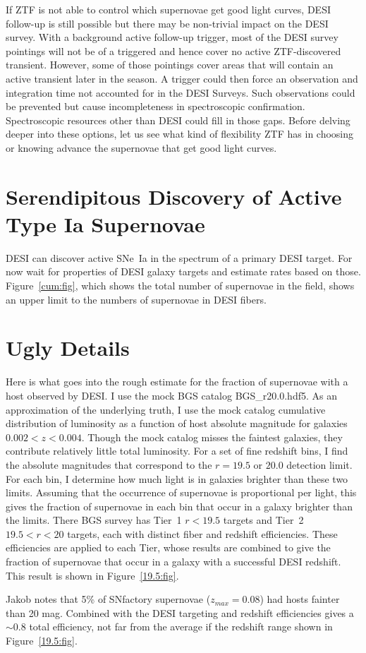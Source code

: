 \documentclass{article}   	%
\begin{document}
If ZTF is not able to control which supernovae get good light curves,
DESI follow-up is still possible but there may be non-trivial
impact on the DESI survey. 
With a background active follow-up trigger, 
most of the DESI survey pointings  will not be of a triggered  and hence cover
no active ZTF-discovered transient.  However, some of those pointings
cover areas that will contain an active transient later in the season.  
A trigger could then force an observation and integration time not accounted for in the DESI Surveys.  Such observations
could be prevented but cause incompleteness in spectroscopic confirmation.
Spectroscopic resources other than DESI could fill in those gaps.
Before delving deeper into these options, let us see what kind of flexibility  ZTF has in choosing or knowing advance the
supernovae that get good light curves.

\section{Serendipitous Discovery of Active Type Ia Supernovae}
DESI can discover active SNe~Ia in the spectrum of a primary DESI target.
For now wait for properties of DESI galaxy targets and estimate rates based on those.  Figure~\ref{cum:fig}, which shows the total number of 
supernovae in the field, shows an upper limit to the numbers of supernovae in DESI fibers.

\appendix
\section{Ugly Details}
\label{details:sec}
\color{red}
Here is what goes into the rough estimate for the fraction of supernovae with a host observed by DESI.  I use the mock BGS catalog BGS\_r20.0.hdf5.
As an  approximation of the underlying truth, I use the mock catalog 
cumulative distribution of luminosity as a function of host absolute magnitude for galaxies $0.002<z<0.004$.  Though the mock catalog misses
the  faintest galaxies, they
contribute relatively little total luminosity.
For a set of fine redshift bins, I find the absolute magnitudes that correspond to the $r=19.5$ or $20.0$ detection limit.  For each bin,
I determine how much light is in galaxies brighter than these two limits.  Assuming that the occurrence of supernovae is proportional per light, this
gives the fraction of supernovae in each bin that occur in a galaxy brighter than the limits.  There BGS survey has Tier~1 $r<19.5$ targets and Tier~2
$19.5<r<20$ targets, each with distinct fiber and redshift efficiencies.  These efficiencies are applied to each Tier, whose results are combined to give
the fraction of supernovae that occur in a galaxy with a successful DESI redshift.  This result is shown in Figure~\ref{19.5:fig}.

Jakob notes that 5\% of SNfactory supernovae ($z_{max}=0.08$) had hosts fainter than 20 mag.  Combined with the DESI targeting and redshift
efficiencies gives a  $\sim 0.8$ total efficiency, not far from the average if the redshift range shown in Figure~\ref{19.5:fig}.

\color{black}
\end{document}
